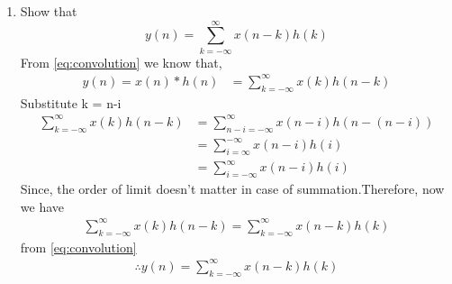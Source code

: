 \documentclass[journal,12pt,twocolumn]{IEEEtran}
\renewcommand\thesection{\arabic{section}}
\begin{document}
\begin{enumerate}[label=\thesection.\arabic*]
\begin{figure}[!htbp]
\label{fig:ynconv}
\end{figure}
\item Show that
\begin{equation}
y(n) =  \sum_{k=-\infty}^{\infty}x(n-k)h(k)
\end{equation}
\solution From \eqref{eq:convolution} we know that,
\begin{align}
y(n) = x(n)*h(n) &= \sum_{k=-\infty}^{\infty}x(k)h(n-k)
\end{align}
Substitute k = n-i
\begin{align}
\sum_{k=-\infty}^{\infty}x(k)h(n-k) &= \sum_{n-i=-\infty}^{\infty}x(n-i)h(n-(n-i))\\ &= \sum_{i=\infty}^{-\infty}x(n-i)h(i)\\ &= \sum_{i=-\infty}^{\infty}x(n-i)h(i)
\end{align}
Since, the order of limit doesn't matter in case of summation.Therefore, now we have
\begin{align}
\sum_{k=-\infty}^{\infty}x(k)h(n-k) = \sum_{k=-\infty}^{\infty}x(n-k)h(k)
\end{align}
from \eqref{eq:convolution}
\begin{align}
\therefore y(n) = \sum_{k=-\infty}^{\infty}x(n-k)h(k)
\end{align}
\end{enumerate}
\end{document}
